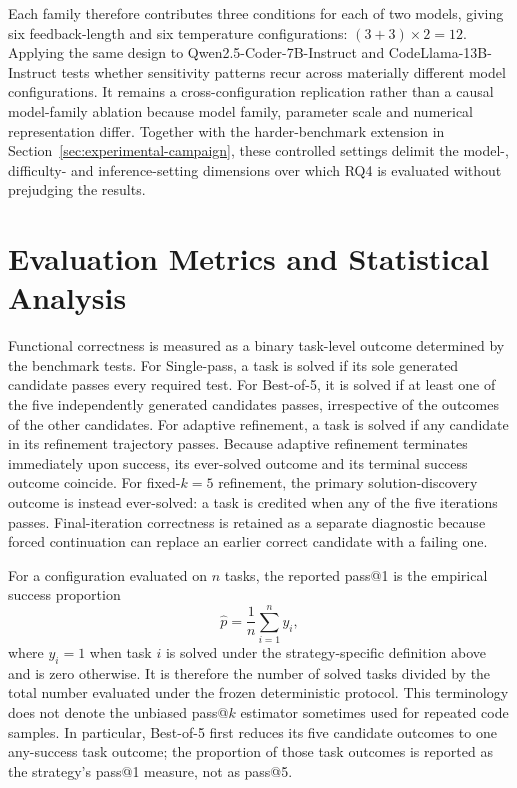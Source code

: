 Each family therefore contributes three conditions for each of two models, giving six feedback-length and six temperature configurations: \((3+3)\times2=12\). Applying the same design to Qwen2.5-Coder-7B-Instruct and CodeLlama-13B-Instruct tests whether sensitivity patterns recur across materially different model configurations. It remains a cross-configuration replication rather than a causal model-family ablation because model family, parameter scale and numerical representation differ. Together with the harder-benchmark extension in Section~\ref{sec:experimental-campaign}, these controlled settings delimit the model-, difficulty- and inference-setting dimensions over which RQ4 is evaluated without prejudging the results.

\section{Evaluation Metrics and Statistical Analysis}
\label{sec:evaluation-metrics}

Functional correctness is measured as a binary task-level outcome determined by the benchmark tests. For Single-pass, a task is solved if its sole generated candidate passes every required test. For Best-of-5, it is solved if at least one of the five independently generated candidates passes, irrespective of the outcomes of the other candidates. For adaptive refinement, a task is solved if any candidate in its refinement trajectory passes. Because adaptive refinement terminates immediately upon success, its ever-solved outcome and its terminal success outcome coincide. For fixed-$k=5$ refinement, the primary solution-discovery outcome is instead ever-solved: a task is credited when any of the five iterations passes. Final-iteration correctness is retained as a separate diagnostic because forced continuation can replace an earlier correct candidate with a failing one.

For a configuration evaluated on $n$ tasks, the reported pass@1 is the empirical success proportion
\[
    \widehat{p}=\frac{1}{n}\sum_{i=1}^{n} y_i,
\]
where $y_i=1$ when task $i$ is solved under the strategy-specific definition above and is zero otherwise. It is therefore the number of solved tasks divided by the total number evaluated under the frozen deterministic protocol. This terminology does not denote the unbiased pass@$k$ estimator sometimes used for repeated code samples. In particular, Best-of-5 first reduces its five candidate outcomes to one any-success task outcome; the proportion of those task outcomes is reported as the strategy's pass@1 measure, not as pass@5.

